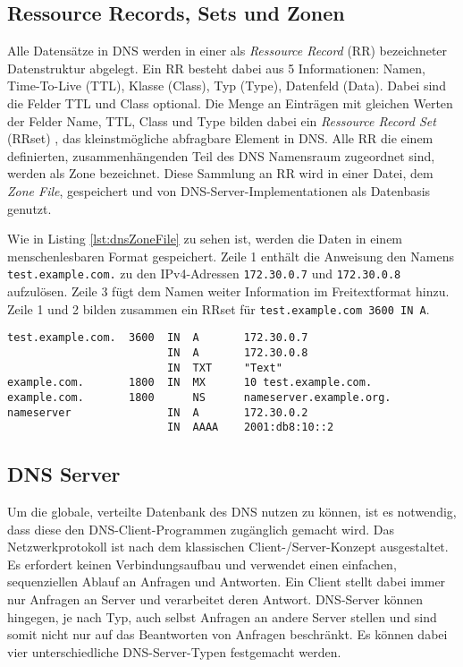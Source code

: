 \subsection{Ressource Records, Sets und Zonen}

Alle Datensätze in DNS werden in einer als \textit{Ressource Record} (RR) bezeichneter Datenstruktur abgelegt. Ein RR besteht dabei aus 5 Informationen: Namen, Time-To-Live (TTL), Klasse (Class), Typ (Type), Datenfeld (Data). Dabei sind die Felder TTL und Class optional. Die Menge an Einträgen mit gleichen Werten der Felder Name, TTL, Class und Type bilden dabei ein \textit{Ressource Record Set} (RRset) \cite{rfc2181}, das kleinstmögliche abfragbare Element in DNS. Alle RR die einem definierten, zusammenhängenden Teil des DNS Namensraum zugeordnet sind, werden als Zone bezeichnet. Diese Sammlung an RR wird in einer Datei, dem \textit{Zone File}, gespeichert und von DNS-Server-Implementationen als Datenbasis genutzt.   

Wie in Listing \ref{lst:dnsZoneFile} zu sehen ist, werden die Daten in einem menschenlesbaren Format gespeichert. Zeile 1 enthält die Anweisung den Namens \texttt{test.example.com.} zu den IPv4-Adressen \texttt{172.30.0.7} und \texttt{172.30.0.8} aufzulösen. Zeile 3 fügt dem Namen weiter Information im Freitextformat hinzu. Zeile 1 und 2 bilden zusammen ein RRset für \texttt{test.example.com 3600 IN A}.

\begin{lstlisting}[caption={Ausschnitt aus dem Zone-File \textit{example.com}}, label={lst:dnsZoneFile}]
test.example.com.  3600  IN  A       172.30.0.7
                         IN  A       172.30.0.8
                         IN  TXT     "Text"
example.com.       1800  IN  MX      10 test.example.com.
example.com.       1800      NS      nameserver.example.org.
nameserver               IN  A       172.30.0.2
                         IN  AAAA    2001:db8:10::2
\end{lstlisting}

\subsection{DNS Server}
\label{subsec:dnsserver}

Um die globale, verteilte Datenbank des DNS nutzen zu können, ist es notwendig, dass diese den DNS-Client-Programmen zugänglich gemacht wird. Das Netzwerkprotokoll ist nach dem klassischen Client-/Server-Konzept ausgestaltet. Es erfordert keinen Verbindungsaufbau und verwendet einen einfachen, sequenziellen Ablauf an Anfragen und Antworten. Ein Client stellt dabei immer nur Anfragen an Server und verarbeitet deren Antwort. DNS-Server können hingegen, je nach Typ, auch selbst Anfragen an andere Server stellen und sind somit nicht nur auf das Beantworten von Anfragen beschränkt. Es können dabei vier unterschiedliche DNS-Server-Typen festgemacht werden.

